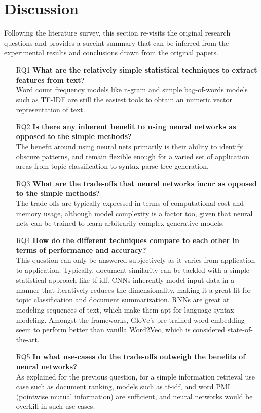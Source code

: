 \documentclass[11pt,a4paper]{article}
\begin{document}


\section{Discussion} %
\label{sec:discussion}

  Following the literature survey, this section re-visits the original research questions and provides a succint summary that can be inferred from the experimental results and conclusions drawn from the original papers.

  \begin{itemize}
    \item [RQ1]
    \textbf{What are the relatively simple statistical techniques to extract features from text?} \\
    Word count frequency models like n-gram and simple bag-of-words models such as TF-IDF are still the easiest tools to obtain an numeric vector representation of text.
    \item [RQ2]
    \textbf{Is there any inherent benefit to using neural networks as opposed to the simple methods?} \\
    The benefit around using neural nets primarily is their ability to identify obscure patterns, and remain flexible enough for a varied set of application areas from topic classification to syntax parse-tree generation.
    \item [RQ3]
    \textbf{What are the trade-offs that neural networks incur as opposed to the simple methods?} \\
    The trade-offs are typically expressed in terms of computational cost and memory usage, although model complexity is a factor too, given that neural nets can be trained to learn arbitrarily complex generative models.
    \item [RQ4]
    \textbf{How do the different techniques compare to each other in terms of performance and accuracy?} \\
    This question can only be answered subjectively as it varies from application to application. Typically, document similarity can be tackled with a simple statistical approach like tf-idf. CNNs inherently model input data in a manner that iteratively reduces the dimensionality, making it a great fit for topic classification and document summarization. RNNs are great at modeling sequences of text, which make them apt for language syntax modeling. Amongst the frameworks, GloVe's pre-trained word-embedding seem to perform better than vanilla Word2Vec, which is considered state-of-the-art.
    \item [RQ5]
    \textbf{In what use-cases do the trade-offs outweigh the benefits of neural networks?} \\
    As explained for the previous question, for a simple information retrieval use case such as document ranking, models such as tf-idf, and word PMI (pointwise mutual information) are sufficient, and neural networks would be overkill in such use-cases.
  \end{itemize}
\end{document}
